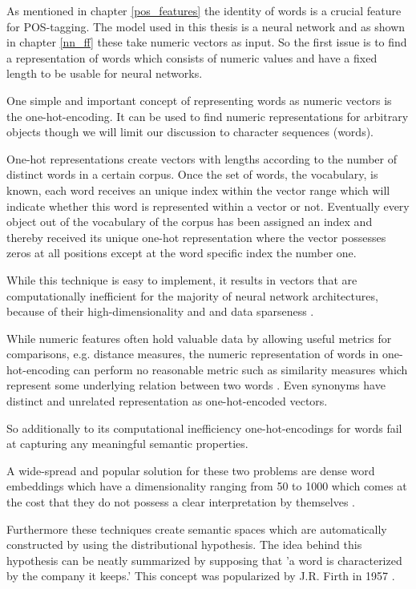 As mentioned in chapter \ref{pos_features} the identity of words is a crucial feature for POS-tagging. The model used in this thesis is a neural network and as shown in chapter \ref{nn_ff} these take numeric vectors as input. So the first issue is to find a representation of words which consists of numeric values and have a fixed length to be usable for neural networks.

One simple and important concept of representing words as numeric vectors is the one-hot-encoding. It can be used to find numeric representations for arbitrary objects though we will limit our discussion to character sequences (words).

One-hot representations create vectors with lengths according to the number of distinct words in a certain corpus. Once the set of words, the vocabulary, is known, each word receives an unique index within the vector range which will indicate whether this word is represented within a vector or not. Eventually every object out of the vocabulary of the corpus has been assigned an index and thereby received its unique one-hot representation where the vector possesses zeros at all positions except at the word specific index the number one. 

While this technique is easy to implement, it results in vectors that are computationally inefficient for the majority of neural network architectures, because of their high-dimensionality and and data sparseness \citep{goldberg2017neural}.

While numeric features often hold valuable data by allowing useful metrics for comparisons, e.g. distance measures, the numeric representation of words in one-hot-encoding can perform no reasonable metric such as similarity measures which represent some underlying relation between two words \citep{hirschle2022deep}. Even synonyms have distinct and unrelated representation as one-hot-encoded vectors.

So additionally to its computational inefficiency one-hot-encodings for words fail at capturing any meaningful semantic properties.

A wide-spread and popular solution for these two problems are dense word embeddings which have a dimensionality ranging from 50 to 1000 which comes at the cost that they do not possess a clear interpretation by themselves \citep{jurafsky2021}.

Furthermore these techniques create semantic spaces which are automatically constructed by using the distributional hypothesis. The idea behind this hypothesis can be neatly summarized by supposing that 'a word is characterized by the company it keeps.' This concept was popularized by J.R. Firth in 1957 \citep{embedding2020pilehvar}.


